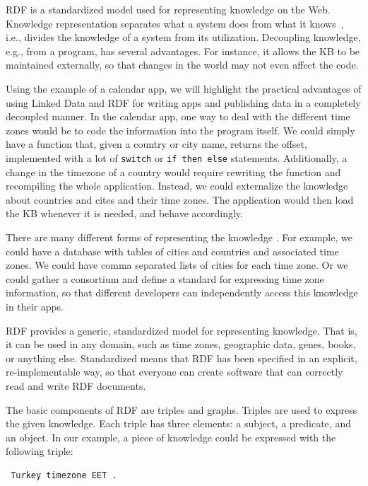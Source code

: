 \ac{RDF} is a standardized model used for representing knowledge on the Web.
Knowledge representation separates what a system does from what it knows~\cite{brachmannKR}, i.e., divides the knowledge of a system from its utilization.
Decoupling knowledge, e.g., from a program, has several advantages.
For instance, it allows the \ac{KB} to be maintained externally, so that changes in the world may not even affect the code.

Using the example of a calendar app, we will highlight the practical advantages of using Linked Data and \ac{RDF} for writing apps and publishing data in a completely decoupled manner.
In the calendar app, one way to deal with the different time zones would be to code the information into the program itself. 
We could simply have a function that, given a country or city name, returns the offset, implemented with a lot of \texttt{switch} or \texttt{if then else} statements.
Additionally, a change in the timezone of a country would require rewriting the function and recompiling the whole application.
Instead, we could externalize the knowledge about countries and cites and their time zones.
The application would then load the \ac{KB} whenever it is needed, and behave accordingly.

There are many different forms of representing the knowledge .
For example, we could have a database with tables of cities and countries and associated time zones.
We could have comma separated lists of cities for each time zone.
Or we could gather a consortium and define a standard for expressing time zone information, so that different developers can independently access this knowledge in their apps.%

\ac{RDF} provides a generic, standardized model for representing knowledge.
That is, it can be used in any domain, such as time zones, geographic data, genes, books, or anything else.
Standardized means that \ac{RDF} has been specified in an explicit, re-implementable way, so that everyone can create software that can correctly read and write \ac{RDF} documents.

The basic components of \ac{RDF} are triples and graphs.
Triples are used to express the given knowledge.
Each triple has three elements: a subject, a predicate, and an object.
In our example, a piece of knowledge could be expressed with the following triple:

\begin{verbatim}
 Turkey timezone EET .
\end{verbatim}

